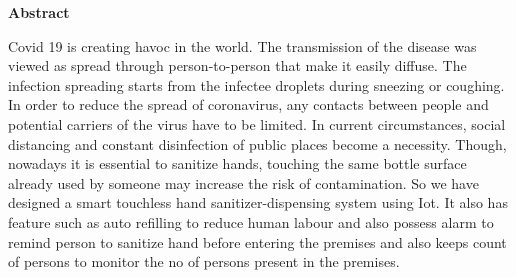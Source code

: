 


\newpage
\begin{center}
	\LARGE\textbf {Abstract} 
\end{center}

\vspace{1.00cm}
Covid 19 is creating havoc in the world. The transmission of the disease was viewed as spread through person-to-person that make it easily diffuse. The infection spreading starts from the infectee droplets during sneezing or coughing. In order to reduce the spread of coronavirus, any contacts between people and potential carriers of the virus have to be limited. In current circumstances, social distancing and constant disinfection of public places become a necessity. Though, nowadays it is essential to sanitize hands, touching the same bottle surface already used by someone may increase the risk of contamination. So we have designed a smart touchless hand sanitizer-dispensing system using Iot. It also has feature such as auto refilling to reduce human labour and also possess alarm to remind person to sanitize hand before entering the premises and also keeps count of persons to monitor the no of  persons present in the premises.






 
 




 




	
	
	


